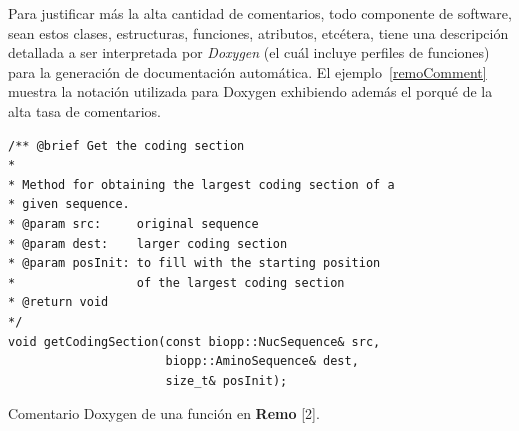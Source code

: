 \par Para justificar más la alta cantidad de comentarios, todo componente de software, sean estos clases, estructuras, funciones, atributos, etcétera, tiene una descripción detallada a ser interpretada por \textit{Doxygen} (el cuál incluye perfiles de funciones) para la generación de documentación automática. El ejemplo~\ref{remoComment} muestra la notación utilizada para Doxygen exhibiendo además el porqué de la alta tasa de comentarios.

\begin{table}[!h]
    \lstset{language=C++}
    \begin{lstlisting}[frame=single]
/** @brief Get the coding section
*
* Method for obtaining the largest coding section of a 
* given sequence.
* @param src:     original sequence
* @param dest:    larger coding section
* @param posInit: to fill with the starting position 
*                 of the largest coding section
* @return void
*/
void getCodingSection(const biopp::NucSequence& src, 
                      biopp::AminoSequence& dest, 
                      size_t& posInit);
    \end{lstlisting}
    \centering \caption{Comentario Doxygen de una función en \textbf{Remo} [2].}
    \label{remoComment}
\end{table}